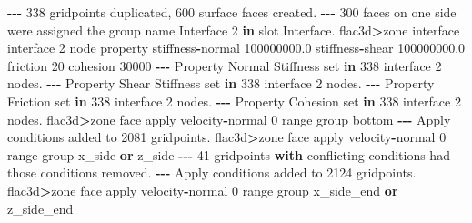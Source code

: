 \documentclass[a4paper, nobind]{templates/ociamthesis}
\newenvironment{Shaded}{\begin{snugshade}}{\end{snugshade}}
\newcommand{\BuiltInTok}[1]{#1}
\newcommand{\ControlFlowTok}[1]{\textcolor[rgb]{0.13,0.29,0.53}{\textbf{#1}}}
\newcommand{\DecValTok}[1]{\textcolor[rgb]{0.00,0.00,0.81}{#1}}
\newcommand{\FloatTok}[1]{\textcolor[rgb]{0.00,0.00,0.81}{#1}}
\newcommand{\KeywordTok}[1]{\textcolor[rgb]{0.13,0.29,0.53}{\textbf{#1}}}
\newcommand{\NormalTok}[1]{#1}
\newcommand{\OperatorTok}[1]{\textcolor[rgb]{0.81,0.36,0.00}{\textbf{#1}}}
\newcommand{\StringTok}[1]{\textcolor[rgb]{0.31,0.60,0.02}{#1}}
\renewenvironment{Shaded}
{
  \vspace{10pt}%
  \begin{snugshade}%
}{%
  \end{snugshade}%
  \vspace{8pt}%
}
\begin{document}
\begin{Shaded}
\begin{Highlighting}[]
\OperatorTok{{-}{-}{-}} \DecValTok{338}\NormalTok{ gridpoints duplicated, }\DecValTok{600}\NormalTok{ surface faces created.}
\OperatorTok{{-}{-}{-}} \DecValTok{300}\NormalTok{ faces on one side were assigned the group name Interface }\DecValTok{2} \KeywordTok{in}\NormalTok{ slot Interface.}
\NormalTok{flac3d}\OperatorTok{\textgreater{}}\NormalTok{zone interface }\StringTok{\textquotesingle{}interface 2\textquotesingle{}}\NormalTok{ node }\BuiltInTok{property}\NormalTok{ stiffness}\OperatorTok{{-}}\NormalTok{normal }\FloatTok{100000000.0}\NormalTok{ stiffness}\OperatorTok{{-}}\NormalTok{shear }\FloatTok{100000000.0}\NormalTok{ friction }\DecValTok{20}\NormalTok{ cohesion }\DecValTok{30000}
\OperatorTok{{-}{-}{-}}\NormalTok{ Property Normal Stiffness }\BuiltInTok{set} \KeywordTok{in} \DecValTok{338}\NormalTok{ interface }\DecValTok{2}\NormalTok{ nodes.}
\OperatorTok{{-}{-}{-}}\NormalTok{ Property Shear Stiffness }\BuiltInTok{set} \KeywordTok{in} \DecValTok{338}\NormalTok{ interface }\DecValTok{2}\NormalTok{ nodes.}
\OperatorTok{{-}{-}{-}}\NormalTok{ Property Friction }\BuiltInTok{set} \KeywordTok{in} \DecValTok{338}\NormalTok{ interface }\DecValTok{2}\NormalTok{ nodes.}
\OperatorTok{{-}{-}{-}}\NormalTok{ Property Cohesion }\BuiltInTok{set} \KeywordTok{in} \DecValTok{338}\NormalTok{ interface }\DecValTok{2}\NormalTok{ nodes.}
\NormalTok{flac3d}\OperatorTok{\textgreater{}}\NormalTok{zone face }\BuiltInTok{apply}\NormalTok{ velocity}\OperatorTok{{-}}\NormalTok{normal }\DecValTok{0} \BuiltInTok{range}\NormalTok{ group }\StringTok{\textquotesingle{}bottom\textquotesingle{}}
\OperatorTok{{-}{-}{-}}\NormalTok{ Apply conditions added to }\DecValTok{2081}\NormalTok{ gridpoints.}
\NormalTok{flac3d}\OperatorTok{\textgreater{}}\NormalTok{zone face }\BuiltInTok{apply}\NormalTok{ velocity}\OperatorTok{{-}}\NormalTok{normal }\DecValTok{0} \BuiltInTok{range}\NormalTok{ group }\StringTok{\textquotesingle{}x\_side\textquotesingle{}} \KeywordTok{or} \StringTok{\textquotesingle{}z\_side\textquotesingle{}}
\OperatorTok{{-}{-}{-}} \DecValTok{41}\NormalTok{ gridpoints }\ControlFlowTok{with}\NormalTok{ conflicting conditions had those conditions removed.}
\OperatorTok{{-}{-}{-}}\NormalTok{ Apply conditions added to }\DecValTok{2124}\NormalTok{ gridpoints.}
\NormalTok{flac3d}\OperatorTok{\textgreater{}}\NormalTok{zone face }\BuiltInTok{apply}\NormalTok{ velocity}\OperatorTok{{-}}\NormalTok{normal }\DecValTok{0} \BuiltInTok{range}\NormalTok{ group }\StringTok{\textquotesingle{}x\_side\_end\textquotesingle{}} \KeywordTok{or} \StringTok{\textquotesingle{}z\_side\_end\textquotesingle{}}

\end{Highlighting}
\end{Shaded}
\end{document}
